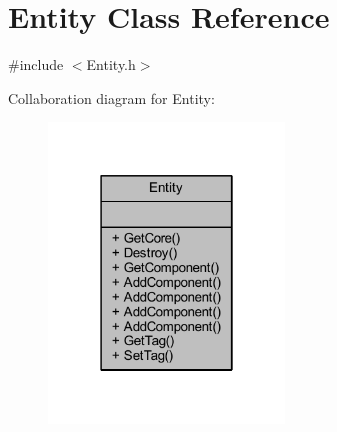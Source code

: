 \hypertarget{class_entity}{}\section{Entity Class Reference}
\label{class_entity}


{\ttfamily \#include $<$Entity.\+h$>$}



Collaboration diagram for Entity\+:
\nopagebreak
\begin{figure}[H]
\begin{center}
\leavevmode
\includegraphics[width=178pt]{class_entity__coll__graph}
\end{center}
\end{figure}
